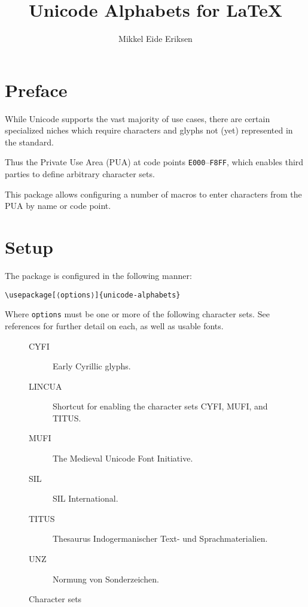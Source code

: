 \documentclass{article}
\title{Unicode Alphabets for \LaTeX}
\author{Mikkel Eide Eriksen}
\begin{document}
\maketitle

\section{Preface}

While Unicode supports the vast majority of use cases, there are certain specialized niches which require characters and glyphs not (yet) represented in the standard.

Thus the Private Use Area (PUA) at code points \texttt{E000}--\texttt{F8FF}, which enables third parties to define arbitrary character sets.

This package allows configuring a number of macros to enter characters from the PUA by name or code point.

\section{Setup}

The package is configured in the following manner:

\begin{verbatim}
\usepackage[⟨options⟩]{unicode-alphabets}
\end{verbatim}

Where \verb|options| must be one or more of the following character sets. See references for further detail on each, as well as usable fonts.

\begin{figure}[H]
\begin{description}

\item[CYFI] Early Cyrillic glyphs\cite{CYFI}.
\item[LINCUA] Shortcut for enabling the character sets CYFI, MUFI, and TITUS\cite{LINCUA}.
\item[MUFI] The Medieval Unicode Font Initiative\cite{MUFI}.
\item[SIL] SIL International\cite{SIL}.
\item[TITUS] Thesaurus Indogermanischer Text- und Sprachmaterialien\cite{TITUS}.
\item[UNZ] Normung von Sonderzeichen\cite{UNZ}.

\end{description}
\caption{Character sets}
\end{figure}
\end{document}
